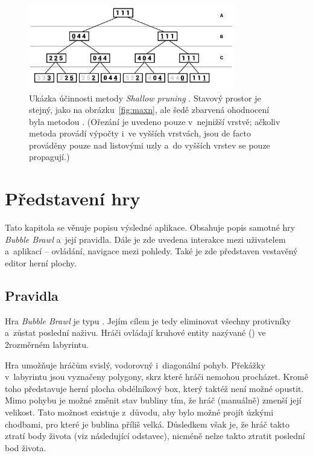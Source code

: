 \begin{figure}[ht]
    \centering
    \includegraphics[width=0.8\textwidth]{doc/obrazky-figures/maxn-shallow-pruning.pdf}
    \caption{Ukázka účinnosti metody \emph{Shallow pruning} \cite{Maxn}. Stavový prostor je stejný, jako na obrázku~\ref{fig:maxn}, ale šedě zbarvená ohodnocení byla metodou . (Ořezání je uvedeno pouze v~nejnižší vrstvě; ačkoliv metoda provádí výpočty i~ve vyšších vrstvách, jsou de facto prováděny pouze nad listovými uzly a~do vyšších vrstev se pouze propagují.)}
    \label{fig:maxn-shallow-pruning}
\end{figure}


\chapter{Představení hry}
\label{ch:predstaveni-hry}

Tato kapitola se věnuje popisu výsledné aplikace. Obsahuje popis samotné hry \emph{Bubble Brawl} a~její pravidla. Dále je zde uvedena interakce mezi uživatelem a~aplikací -- ovládání, navigace mezi pohledy. Také je zde představen vestavěný editor herní plochy.

\section{Pravidla}

Hra \emph{Bubble Brawl} je typu . Jejím cílem je tedy eliminovat všechny protivníky a~zůstat poslední naživu. Hráči ovládají kruhové entity nazývané  () ve 2rozměrném labyrintu. 

Hra umožňuje hráčům svislý, vodorovný i~diagonální pohyb. Překážky v~labyrintu jsou vyznačeny polygony, skrz které hráči nemohou procházet. Kromě toho představuje herní plocha obdélníkový box, který taktéž není možné opustit. Mimo pohybu je možné změnit stav bubliny tím, že hráč (manuálně) zmenší její velikost. Tato možnost existuje z~důvodu, aby bylo možné projít úzkými chodbami, pro které je bublina příliš velká. Důsledkem však je, že hráč takto ztratí body života (viz následující odstavec), nicméně nelze takto ztratit poslední bod života.


